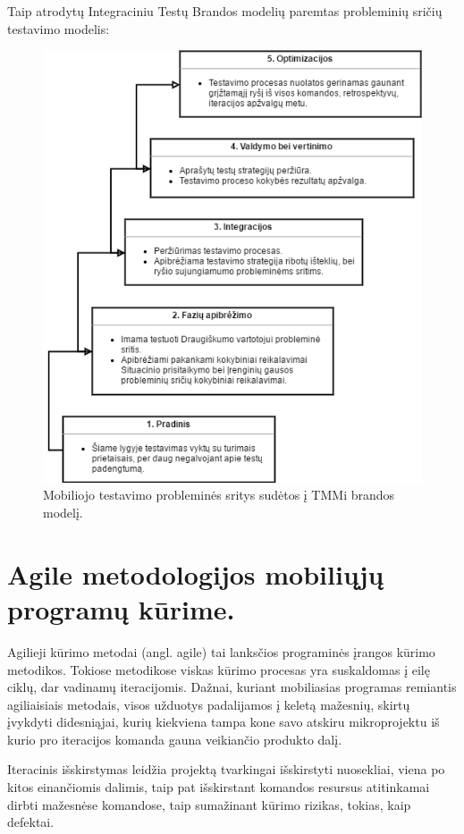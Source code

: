 \documentclass{VUMIFPSkursinis}
\begin{document}
Taip atrodytų Integraciniu Testų Brandos modelių paremtas probleminių sričių testavimo modelis:
\begin{figure}[H]
    \centering
    \includegraphics[scale=0.85]{img/Tmmimobile}
    \caption{Mobiliojo testavimo probleminės sritys sudėtos į TMMi brandos modelį.}
    \label{img:tmmimobile}
\end{figure}

\section{Agile metodologijos mobiliųjų programų kūrime.}
Agilieji kūrimo metodai (angl. agile) tai lanksčios programinės įrangos kūrimo metodikos. Tokiose metodikose viskas kūrimo procesas yra suskaldomas į eilę ciklų, dar vadinamų iteracijomis. Dažnai, kuriant mobiliasias programas remiantis agiliaisiais metodais, visos užduotys padalijamos į keletą mažesnių, skirtų įvykdyti didesniąjai, kurių kiekviena tampa kone savo atskiru mikroprojektu iš kurio pro iteracijos komanda gauna veikiančio produkto dalį.

Iteracinis išskirstymas leidžia projektą tvarkingai išskirstyti nuosekliai, viena po kitos einančiomis dalimis, taip pat išskirstant komandos resursus atitinkamai dirbti mažesnėse komandose, taip sumažinant kūrimo rizikas, tokias, kaip defektai.
\end{document}
